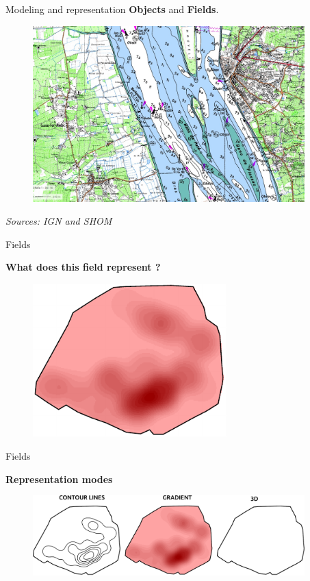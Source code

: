 \begin{frame}{Modeling and representation}
\textbf{Objects} and  \textbf{Fields}.

\begin{figure}
\includegraphics[width=10.5cm]{FortMedoc.jpg}
\end{figure}

\footnotesize
\textit{Sources: IGN and SHOM }
\normalsize

\end{frame}



\begin{frame}{Fields}

\textbf{What does this field represent ?}

\begin{figure}
\includegraphics[width=7.5cm]{Champs.pdf}
\end{figure}

\end{frame}


\begin{frame}{Fields}

\textbf{Representation modes}

\begin{figure}
\includegraphics[width=10.5cm]{DeuxSorties_EN.pdf}
\end{figure}

\end{frame}



